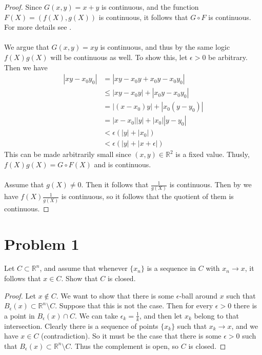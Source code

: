 \documentclass{article}
\theoremstyle{definition}
\begin{document}
    \begin{proof}
         Since $G(x,y) = x + y$ is continuous, and the function $F(X) = (f(X),g(X))$ is continuous, it follows that $G \circ F$ is continuous.
        For more details see .\\\\
         We argue that $G(x,y) = xy$ is continuous, and thus by the same logic $f(X)g(X)$ will be continuous as well.
        To show this, let $\epsilon > 0$ be arbitrary. Then we have 
        \begin{align*}
            |xy - x_0y_0| &= |xy - x_0y + x_0y - x_0y_0| \\
            &\leqslant |xy -x_0y| + |x_0y - x_0y_0| \\
            &= |(x-x_0)y| + |x_0(y - y_0)| \\
            &= |x-x_0||y| + |x_0||y-y_0| \\
            &< \epsilon (|y| + |x_0|) \\
            & <\epsilon(|y| + |x + \epsilon|)
        \end{align*}
        This can be made arbitrarily small since $(x,y)\in\mathbb{R}^2$ is a fixed value.
        Thusly, $f(X)g(X) = G \circ F(X)$ and is continuous.\\\\
        Assume that $g(X) \neq 0$. Then it follows that $\frac{1}{g(X)}$ is continuous. Then by  we have $f(X) \frac{1}{g(X)}$ is continuous, so it
        follows that the quotient of them is continuous.
    \end{proof}
\section*{Problem 1}
\begin{mdframed}
    Let $C \subset \mathbb{R}^n$, and assume that whenever $\{ x_n \}$ is a sequence in $C$ with $x_n \rightarrow x$, it follows that $x \in C$. Show that $C$ is closed.
\end{mdframed}
\begin{proof}
    Let $x \notin C$. We want to show that there is some $\epsilon$-ball around $x$ such that 
    $B_\epsilon(x) \subset \mathbb{R}^n \setminus C$. Suppose that this is not the case. Then for every $\epsilon > 0$ there is a point in $B_\epsilon(x) \cap C$.
    We can take $\epsilon_k = \frac{1}{k}$, and then let $x_k$ belong to that intersection.
    Clearly there is a sequence of points $\{x_k\}$ such that $x_k \rightarrow x$, and we have $x \in C$ (contradiction).
    So it must be the case that there is some $\epsilon > 0$ such that $B_\epsilon(x) \subset \mathbb{R}^n \setminus C$.
    Thus the complement is open, so $C$ is closed.
\end{proof}
\end{document}
